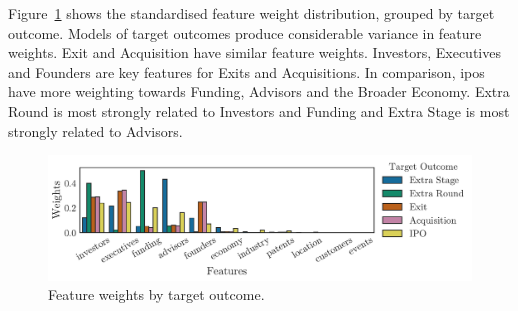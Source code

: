 \documentclass[../thesis/thesis.tex]{subfiles}
\begin{document}
Figure~\ref{fig:evaluation:features_outcome} shows the standardised feature weight distribution, grouped by target outcome. Models of target outcomes produce considerable variance in feature weights. Exit and Acquisition have similar feature weights. Investors, Executives and Founders are key features for Exits and Acquisitions. In comparison, \gls{ipo}s have more weighting towards Funding, Advisors and the Broader Economy. Extra Round is most strongly related to Investors and Funding and Extra Stage is most strongly related to Advisors.

\begin{figure}[!htb]
    \centering
    \includegraphics[width=\textwidth]{../figures/evaluation/features_outcome}
    \caption[Feature weights by target outcome]{Feature weights by target outcome.}
    \label{fig:evaluation:features_outcome}
\end{figure}

\end{document}
